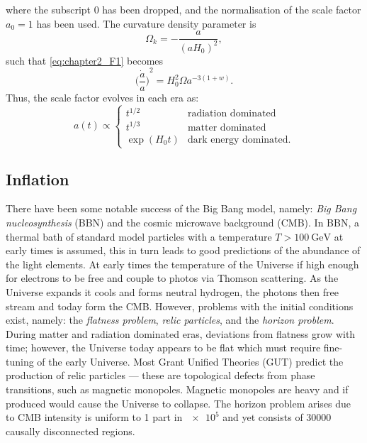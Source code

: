 %
where the subscript \(0\) has been dropped, and the normalisation of the scale factor \(a_{0}=1\) has been used.
The curvature density parameter is
%
\begin{equation}
	\Omega_{k}
	= -\frac{a}{{(aH_{0})}^{2}},
\end{equation}
%
such that \cref{eq:chapter2_F1} becomes
%
\begin{equation}
	{\bigg(\frac{\dot{a}}{a}\bigg)}^{2}
	= H_{0}^{2} \Omega a^{-3(1+w)}.
\end{equation}
%
Thus, the scale factor evolves in each era as:
%
\begin{equation}
	a(t) \propto
	\begin{cases}
		t^{1/2}      & \text{radiation dominated}    \\
		t^{1/3}      & \text{matter dominated}       \\
		\exp(H_{0}t) & \text{dark energy dominated}.
	\end{cases}
\end{equation}

\subsection{Inflation}\label{sec:chapter2_inflation}

There have been some notable success of the Big Bang model, namely: \emph{Big Bang nucleosynthesis} (BBN) and the cosmic microwave background (CMB).
In BBN, a thermal bath of standard model particles with a temperature \(T > \SI{100}{\giga\eV}\) at early times is assumed, this in turn leads to good predictions of the abundance of the light elements.
At early times the temperature of the Universe if high enough for electrons to be free and couple to photos via Thomson scattering.
As the Universe expands it cools and forms neutral hydrogen, the photons then free stream and today form the CMB\@.
However, problems with the initial conditions exist, namely: the \emph{flatness problem}, \emph{relic particles}, and the \emph{horizon problem}.
During matter and radiation dominated eras, deviations from flatness grow with time; however, the Universe today appears to be flat which must require fine-tuning of the early Universe.
Most Grant Unified Theories (GUT) predict the production of relic particles --- these are topological defects from phase transitions, such as magnetic monopoles.
Magnetic monopoles are heavy and if produced would cause the Universe to collapse.
The horizon problem arises due to CMB intensity is uniform to 1 part in \(\num{e5}\) and yet consists of \(\num{30000}\) causally disconnected regions.

